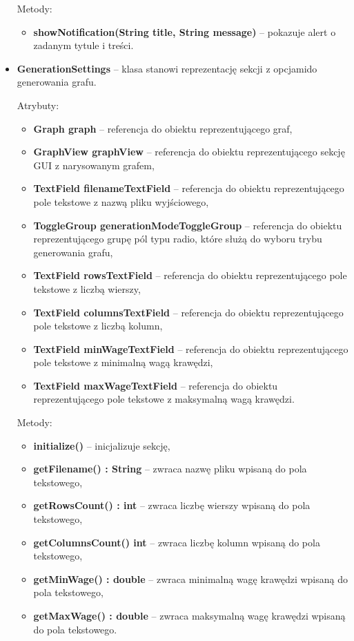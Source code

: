\documentclass{article}
\begin{document}
\begin{itemize}
    Metody:
    \begin{itemize}
        \item \textbf{showNotification(String title, String message)} -- pokazuje alert o zadanym tytule i treści.
    \end{itemize}
    
\newpage
    
    \item \textbf{GenerationSettings} -- klasa stanowi reprezentację sekcji z opcjami\linebreak do generowania grafu.
    
    Atrybuty:
    \begin{itemize}
        \item \textbf{Graph graph} -- referencja do obiektu reprezentującego graf,
        \item \textbf{GraphView graphView} -- referencja do obiektu reprezentującego sekcję GUI z narysowanym grafem,
        \item \textbf{TextField filenameTextField} -- referencja do obiektu reprezentującego pole tekstowe z nazwą pliku wyjściowego,
        \item \textbf{ToggleGroup generationModeToggleGroup} -- referencja do obiektu reprezentującego grupę pól typu radio, które służą do wyboru trybu generowania grafu,
        \item \textbf{TextField rowsTextField} -- referencja do obiektu reprezentującego pole tekstowe z liczbą wierszy,
        \item \textbf{TextField columnsTextField} -- referencja do obiektu reprezentującego pole tekstowe z liczbą kolumn,
        \item \textbf{TextField minWageTextField} -- referencja do obiektu reprezentującego pole tekstowe z minimalną wagą krawędzi,
        \item \textbf{TextField maxWageTextField} -- referencja do obiektu reprezentującego pole tekstowe z maksymalną wagą krawędzi.
    \end{itemize}
    
    Metody:
    \begin{itemize}
        \item \textbf{initialize()} -- inicjalizuje sekcję,
        \item \textbf{getFilename() : String} -- zwraca nazwę pliku wpisaną do pola tekstowego,
        \item \textbf{getRowsCount() : int} -- zwraca liczbę wierszy wpisaną do pola tekstowego,
        \item \textbf{getColumnsCount() int} -- zwraca liczbę kolumn wpisaną do pola tekstowego,
        \item \textbf{getMinWage() : double} -- zwraca minimalną wagę krawędzi wpisaną do pola tekstowego,
        \item \textbf{getMaxWage() : double} -- zwraca maksymalną wagę krawędzi wpisaną do pola tekstowego.
    \end{itemize}
    

\end{itemize}
\end{document}
